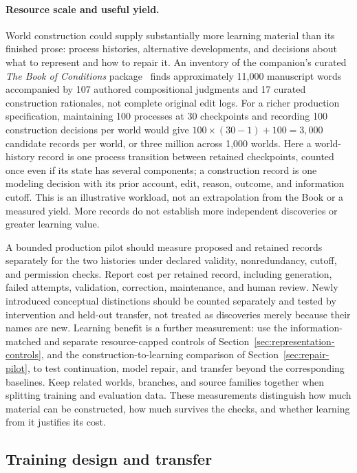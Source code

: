 \documentclass[10pt]{article}
\newcommand{\Book}{\textit{The Book of Conditions}}
\begin{document}
\paragraph{Resource scale and useful yield.}
World construction could supply substantially more learning material than its
finished prose: process histories, alternative developments, and decisions
about what to represent and how to repair it. An inventory of the companion's
curated \Book{} package~\cite{westerbergMeaning2026} finds approximately
11,000 manuscript words accompanied by 107 authored compositional judgments
and 17 curated construction rationales, not complete original edit logs.
For a richer production specification, maintaining 100 processes at 30
checkpoints and recording 100 construction decisions per world would give
$100\times(30-1)+100=3{,}000$ candidate records per world, or three million
across 1,000 worlds. Here a world-history record is one process transition
between retained checkpoints, counted once even if its state has several
components; a construction record is one modeling decision with its prior
account, edit, reason, outcome, and information cutoff. This is an illustrative
workload, not an extrapolation from the Book or a measured yield. More records
do not establish more independent discoveries or greater learning value.

A bounded production pilot should measure proposed and retained records
separately for the two histories under declared validity, nonredundancy,
cutoff, and permission checks. Report cost per retained record, including
generation, failed attempts, validation, correction, maintenance, and human
review. Newly introduced conceptual distinctions should be counted separately
and tested by intervention and held-out transfer, not treated as discoveries
merely because their names are new. Learning benefit is a further measurement:
use the information-matched and separate resource-capped controls of
Section~\ref{sec:representation-controls}, and the construction-to-learning
comparison of Section~\ref{sec:repair-pilot}, to test continuation, model repair,
and transfer beyond the corresponding baselines. Keep related worlds,
branches, and source families together when splitting training and evaluation
data. These measurements distinguish how much material can be constructed,
how much survives the checks, and whether learning from it justifies its cost.

\subsection{Training design and transfer}
\label{sec:training-design}
\end{document}
